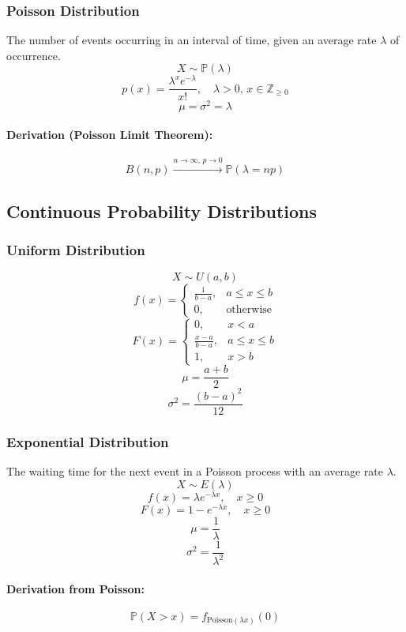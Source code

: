 \documentclass{article}
\begin{document}
\subsubsection{Poisson Distribution}
The number of events occurring in an interval of time, given an average rate $ \lambda $ of occurrence.
\[ X \sim \mathbb{P}(\lambda) \]
\[ p(x) = \frac{\lambda^x e^{-\lambda}}{x!}, \quad \lambda>0, \, x \in \mathbb{Z}_{\geq 0} \]
\[ \mu = \sigma^2 = \lambda \]
\paragraph{Derivation (Poisson Limit Theorem):}
\[
    B(n, p) \xrightarrow{n \to \infty,\, p \to 0} \mathbb{P}(\lambda = np)
\]

\subsection{Continuous Probability Distributions}

\subsubsection{Uniform Distribution}
\[
    X \sim U(a, b)
\]
\[
    f(x) =
    \begin{cases}
        \frac{1}{b-a}, & a \leq x \leq b \\
        0, & \text{otherwise}
    \end{cases}
\]
\[
    F(x) =
    \begin{cases}
        0, & x < a \\
        \frac{x-a}{b-a}, & a \leq x \leq b \\
        1, & x > b
    \end{cases}
\]
\[
    \mu = \frac{a+b}{2}
\]
\[
    \sigma^2 = \frac{(b-a)^2}{12}
\]

\subsubsection{Exponential Distribution}
The waiting time for the next event in a Poisson process with an average rate $ \lambda $.
\[ X \sim E(\lambda) \]
\[
    f(x) = \lambda e^{-\lambda x}, \quad x \geq 0
\]
\[
    F(x) = 1 - e^{-\lambda x}, \quad x \geq 0
\]
\[
    \mu = \frac{1}{\lambda}
\]
\[
    \sigma^2 = \frac{1}{\lambda^2}
\]
\paragraph{Derivation from Poisson:}
\[
    \mathbb{P}(X>x) = f_{\text{Poisson}(\lambda x)}(0)
\]
\end{document}
